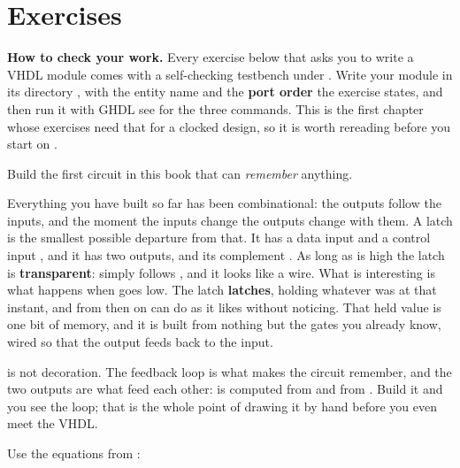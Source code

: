 
\section{Exercises}
\label{c3:sec:exercises}

\begin{aside}
\textbf{How to check your work.} Every exercise below that asks you to write a VHDL module comes
with a self-checking testbench under . Write your module in its
directory , with the entity name and the \textbf{port order} the exercise
states, and then run it with GHDL \textemdash{} see  for the three
commands. This is the first chapter whose exercises need that for a clocked design, so it is worth
rereading before you start on .
\end{aside}


\label{c3:ex:latch}
Build the first circuit in this book that can \emph{remember} anything.

Everything you have built so far has been combinational: the outputs follow the inputs, and the
moment the inputs change the outputs change with them. A latch is the smallest possible departure
from that. It has a data input  and a control input , and it has two outputs,
 and its complement . As long as  is high the latch is
\textbf{transparent}:  simply follows , and it looks like a wire. What is
interesting is what happens when  goes low. The latch \textbf{latches}, holding
whatever  was at that instant, and from then on  can do as it likes without
 noticing. That held value is one bit of memory, and it is built from nothing but the gates
you already know, wired so that the output feeds back to the input.

 is not decoration. The feedback loop is what makes the circuit remember, and the two
outputs are what feed each other:  is computed from  and  from .
Build it and you see the loop; that is the whole point of drawing it by hand before you even meet
the VHDL.

Use the equations from :

